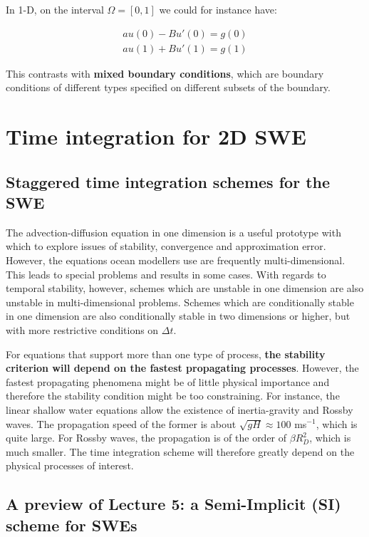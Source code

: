 In 1-D, on the interval $\Omega=[0,1]$ we could for instance have:

\begin{eqnarray}
	au(0)-Bu'(0)=g(0) \\
	au(1)+Bu'(1)=g(1)
\end{eqnarray}

This contrasts with \textbf{mixed boundary conditions}, which are boundary conditions of different types specified on different subsets of the boundary.

\clearpage

\section{Time integration for 2D SWE}
\subsection{Staggered time integration schemes for the SWE}

The advection-diffusion equation in one dimension is a useful prototype with which to explore issues of stability, convergence and approximation error. However, the equations ocean modellers use are frequently multi-dimensional. This leads to special problems and results in some cases. With regards to temporal stability, however, schemes which are unstable in one dimension are also unstable in multi-dimensional problems. Schemes which are conditionally stable in one dimension are also conditionally stable in two dimensions or higher, but with more restrictive conditions on $\Delta t$.

\vspace{0.2cm}For equations that support more than one type of process, {\bf the stability criterion will depend on the fastest propagating processes}. However, the fastest propagating phenomena might be of little physical importance and therefore the stability condition might be too constraining. For instance, the linear shallow water equations allow the existence of inertia-gravity and Rossby waves. The propagation speed of the former is about $\sqrt{gH} \approx 100 $ ms$^{-1}$, which is quite large. For Rossby waves, the propagation is of the order of $\beta R_D^2$, which is much smaller. The time integration scheme will therefore greatly depend on the physical processes of interest. 

\subsection{A preview of Lecture 5: a Semi-Implicit (SI) scheme for SWEs}

